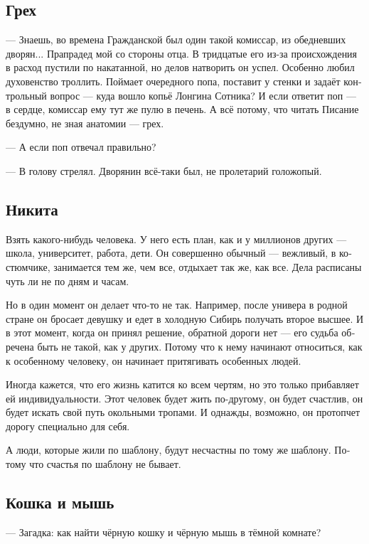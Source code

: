\documentclass[a5paper,12pt,fleqn]{extbook}\usepackage{cooltooltips}\usepackage{polyglossia}\setdefaultlanguage[babelshorthands=true]{russian}\setotherlanguage{english}\defaultfontfeatures{Ligatures=TeX,Mapping=tex-text} \usepackage{xcolor}\definecolor{lightgray}{HTML}{bbbbbb}\color{lightgray}\newcommand{\ml}[3]{\textenglish{\textcolor{black}{#3}}}
\begin{document}
\subsection{Грех}

--- Знаешь, во времена Гражданской был один такой комиссар, из обедневших дворян...
Прапрадед мой со стороны отца.
В тридцатые его из-за происхождения в расход пустили по накатанной, но делов натворить он успел.
Особенно любил духовенство троллить.
Поймает очередного попа, поставит у стенки и задаёт контрольный вопрос --- куда вошло копьё Лонгина Сотника?
И если ответит поп --- в сердце, комиссар ему тут же пулю в печень.
А всё потому, что читать Писание бездумно, не зная анатомии --- грех.

--- А если поп отвечал правильно?

--- В голову стрелял.
Дворянин всё-таки был, не пролетарий голожопый.

\subsection{Никита}

Взять какого-нибудь человека.
У него есть план, как и у миллионов других --- школа, университет, работа, дети.
Он совершенно обычный --- вежливый, в костюмчике, занимается тем же, чем все, отдыхает так же, как все.
Дела расписаны чуть ли не по дням и часам.

Но в один момент он делает что-то не так.
Например, после универа в родной стране он бросает девушку и едет в холодную Сибирь получать второе высшее.
И в этот момент, когда он принял решение, обратной дороги нет --- его судьба обречена быть не такой, как у других.
Потому что к нему начинают относиться, как к особенному человеку, он начинает притягивать особенных людей.

Иногда кажется, что его жизнь катится ко всем чертям, но это только прибавляет ей индивидуальности.
Этот человек будет жить по-другому, он будет счастлив, он будет искать свой путь окольными тропами.
И однажды, возможно, он протопчет дорогу специально для себя.

А люди, которые жили по шаблону, будут несчастны по тому же шаблону.
Потому что счастья по шаблону не бывает.

\subsection{Кошка и мышь}

--- Загадка: как найти чёрную кошку и чёрную мышь в тёмной комнате?
\end{document}
